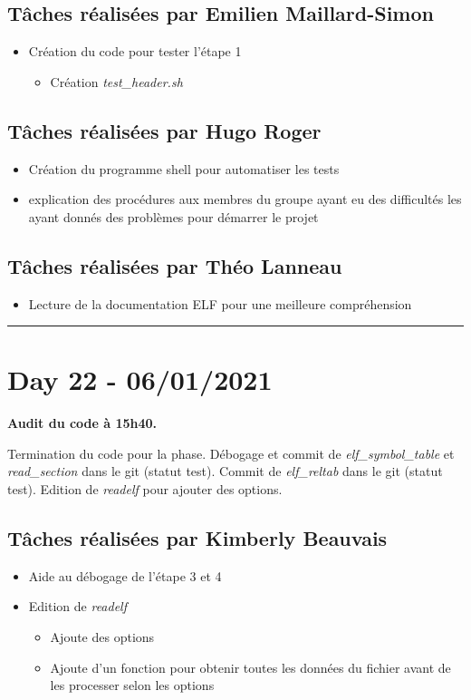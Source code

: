 \documentclass[11pt,letterpaper]{article}
\begin{document}
\subsection*{Tâches réalisées par Emilien Maillard-Simon}
\begin{itemize}
    \item Création du code pour tester l'étape 1
    \begin{itemize}
        \item Création \textit{test\_header.sh} 
    \end{itemize} 
\end{itemize}

\subsection*{Tâches réalisées par Hugo Roger}
\begin{itemize}
    \item Création du programme shell pour automatiser les tests
    \item explication des procédures aux membres du groupe ayant 
    eu des difficultés les ayant donnés des problèmes pour démarrer le projet
\end{itemize}

\subsection*{Tâches réalisées par Théo Lanneau}
\begin{itemize}
    \item Lecture de la documentation ELF pour une meilleure compréhension 
\end{itemize}

\noindent\rule{13cm}{0.4pt}

\section*{Day 22 - 06/01/2021}
\textbf{Audit du code à 15h40.}

\noindent Termination du code pour la phase.
Débogage et commit de \textit{elf\_symbol\_table} et \textit{read\_section} 
dans le git (statut test). Commit de \textit{elf\_reltab} dans le git (statut 
test). Edition de \textit{readelf} pour ajouter des options. 

\subsection*{Tâches réalisées par Kimberly Beauvais}
\begin{itemize}
    \item Aide au débogage de l'étape 3 et 4
    \item Edition de \textit{readelf}
    \begin{itemize}
        \item Ajoute des options
        \item Ajoute d'un fonction pour obtenir toutes les données du fichier avant 
        de les processer selon les options
    \end{itemize}
\end{itemize}
\end{document}
